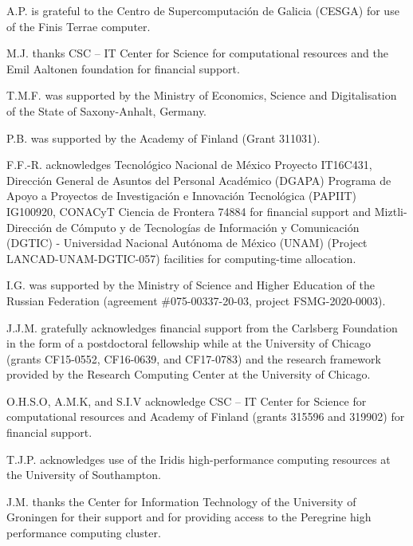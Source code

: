 \documentclass[aps,prl,superscriptaddress,twocolumn]{revtex4}
\begin{document}
\begin{acknowledgments}
A.P. is grateful to the Centro de
Supercomputación de Galicia (CESGA) for use of the Finis
Terrae computer.

M.J. thanks CSC -- IT Center for Science for computational resources and the Emil Aaltonen foundation for financial support.

T.M.F. was supported by the Ministry of Economics, Science
and Digitalisation of the State of Saxony-Anhalt, Germany.

P.B. was supported by the Academy of Finland (Grant 311031).

F.F.-R. acknowledges Tecnol\'{o}gico Nacional de M\'{e}xico Proyecto IT16C431, Direcci\'{o}n General de Asuntos del Personal Acad\'{e}mico (DGAPA) Programa de Apoyo a Proyectos de Investigaci\'{o}n e Innovaci\'{o}n Tecnol\'{o}gica (PAPIIT) IG100920, CONACyT Ciencia de Frontera 74884 for financial support and Miztli-Direcci\'{o}n de C\'{o}mputo y de Tecnolog\'{i}as de Informaci\'{o}n y Comunicaci\'{o}n (DGTIC) - Universidad Nacional Aut\'{o}noma de M{\'e}xico (UNAM) (Project LANCAD-UNAM-DGTIC-057) facilities for computing-time allocation.

I.G. was supported by the Ministry of Science and Higher Education of the Russian Federation (agreement \#075-00337-20-03, project FSMG-2020-0003). 

J.J.M. gratefully acknowledges financial support from the Carlsberg 
Foundation in the form of a postdoctoral fellowship while at 
the University of Chicago (grants CF15-0552, CF16-0639, and 
CF17-0783) and the research framework provided by the 
Research Computing Center at the University of Chicago.

O.H.S.O, A.M.K, and S.I.V acknowledge CSC -- IT Center for Science for computational resources and Academy of Finland (grants 315596 and 319902) for financial support.

T.J.P. acknowledges use of the Iridis high-performance computing resources at the University of Southampton.

J.M. thanks the Center for Information Technology of the University of Groningen for their support and for providing access to the Peregrine high performance computing cluster.

\end{acknowledgments}





\end{document}
